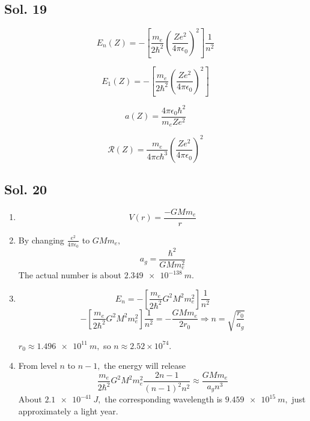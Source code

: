     \subsection*{Sol. 19}

    $$
    E_n(Z)
    =-\left[\frac{m_e}{2\hbar^2}
    \left(
    \frac{Ze^2}{4\pi\epsilon_0}
    \right)^2
    \right] 
    \frac{1}{n^2}
    $$

    $$
    E_1(Z)
    =-\left[\frac{m_e}{2\hbar^2}
    \left(
    \frac{Ze^2}{4\pi\epsilon_0}
    \right)^2
    \right] 
    $$

    $$
    a(Z)
    =\frac{4\pi\epsilon_0\hbar^2}{m_eZe^2}
    $$

    $$\mathcal{R}(Z)
    =\frac{m_e}{4\pi c\hbar^3}
    \left(
    \frac{Ze^2}{4\pi\epsilon_0}
    \right)^2
    $$


    \subsection*{Sol. 20}
    \begin{enumerate}
        \item 
        $$
        V(r)=\frac{-GMm_e}{r}
        $$
        \item By changing $\frac{e^2}{4\pi\epsilon_0}$ to $GMm_e,$
        $$
        a_g = \frac{\hbar^2}{GMm_e^2}
        $$
        The actual number
        is about $\qty{2.349e-138}{m}.$
        \item 
        $$
        E_n = 
        -\left[
        \frac{m_e}{2\hbar^2}
        G^2M^2m_e^2
        \right]\frac{1}{n^2}
        $$
        $$
        -\left[
        \frac{m_e}{2\hbar^2}
        G^2M^2m_e^2
        \right]\frac{1}{n^2}
        =-\frac{GMm_e}{2r_0}
        \Rightarrow n = \sqrt{\frac{r_0}{a_g}}
        $$

        $r_0\approx \qty{1.496e11}{m},$
        so $n\approx 2.52\times10^{74}.$
        \item 
        From level $n$ to $n-1,$ the energy will release
        $$
        \frac{m_e}{2\hbar^2}G^2M^2m_e^2
        \frac{2n-1}{(n-1)^2n^2}
        \approx
        \frac{GMm_e}{a_gn^3}
        $$
        About $\qty{2.1e-41}{J},$
        the corresponding wavelength is 
        $\qty{9.459e15}{m},$ just approximately a light year.
    \end{enumerate}

